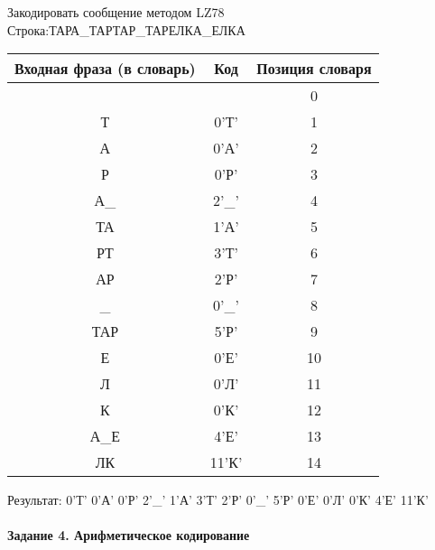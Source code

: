 \documentclass[a4paper, 12pt]{article}
\begin{document}
Закодировать сообщение методом LZ78\\
Строка:ТАРА\_ТАРТАР\_ТАРЕЛКА\_ЕЛКА\\
\begin{table}[h!]
\centering
\begin{tabular}{|c|c|c|} 
\hline
 Входная фраза (в словарь) & Код & Позиция словаря \\ \hline

 &  & 0 \\ \hline
Т & 0'Т' & 1 \\ \hline
А & 0'А' & 2 \\ \hline
Р & 0'Р' & 3 \\ \hline
А\_ & 2'\_' & 4 \\ \hline
ТА & 1'А' & 5 \\ \hline
РТ & 3'Т' & 6 \\ \hline
АР & 2'Р' & 7 \\ \hline
\_ & 0'\_' & 8 \\ \hline
ТАР & 5'Р' & 9 \\ \hline
Е & 0'Е' & 10 \\ \hline
Л & 0'Л' & 11 \\ \hline
К & 0'К' & 12 \\ \hline
А\_Е & 4'Е' & 13 \\ \hline
ЛК & 11'К' & 14 \\ \hline
\end{tabular}
\end{table}

Результат: 0'Т' 0'А' 0'Р' 2'\_' 1'А' 3'Т' 2'Р' 0'\_' 5'Р' 0'Е' 0'Л' 0'К' 4'Е' 11'К'\\
\pagebreak
\paragraph{Задание 4. Арифметическое кодирование\\}
\end{document}
